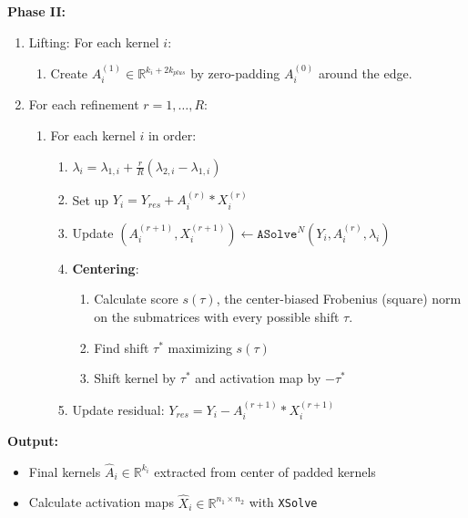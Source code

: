 \begin{algorithm}
	\textbf{Phase II:}
	\begin{enumerate}
		\item Lifting: For each kernel $i$:
		\begin{enumerate}
			\item Create $A^{(1)}_i \in \mathbb{R}^{k_i + 2k_{plus}}$ by zero-padding $A^{(0)}_i$ around the edge. 
		\end{enumerate}
		\item For each refinement $r=1,\dots,R$:
		\begin{enumerate}
			\item For each kernel $i$ in order:
			\begin{enumerate}
				\item $\lambda_i = \lambda_{1,i} +\frac{r}{R}(\lambda_{2,i}- \lambda_{1,i})$
				\item Set up $Y_{i} = Y_{res} + A_i^{(r)} * X_i^{(r)}$
				\item Update $(A_i^{(r+1)}, X_i^{(r+1)}) \leftarrow \texttt{ASolve}^N(Y_{i},  A_i^{(r)}, \lambda_i)$
				\item \textbf{Centering}:
				\begin{enumerate}
					\item Calculate score $s(\tau)$, the center-biased Frobenius (square) norm on the submatrices with every possible shift $\tau$.
					\item Find shift $\tau^*$ maximizing $s(\tau)$
					\item Shift kernel by $\tau^*$ and activation map by $-\tau^*$
				\end{enumerate}
				\item Update residual: $Y_{res} = Y_{i} - A_i^{(r+1)} * X_i^{(r+1)}$
			\end{enumerate}
		\end{enumerate}
	\end{enumerate}
	
	\textbf{Output:}
	\begin{itemize}
		\item Final kernels $\hat{A}_i \in \mathbb{R}^{k_i}$ extracted from center of padded kernels
		\item Calculate activation maps $\hat{X}_i \in \mathbb{R}^{n_1 \times n_2}$ with \texttt{XSolve}
	\end{itemize}
\end{algorithm}
